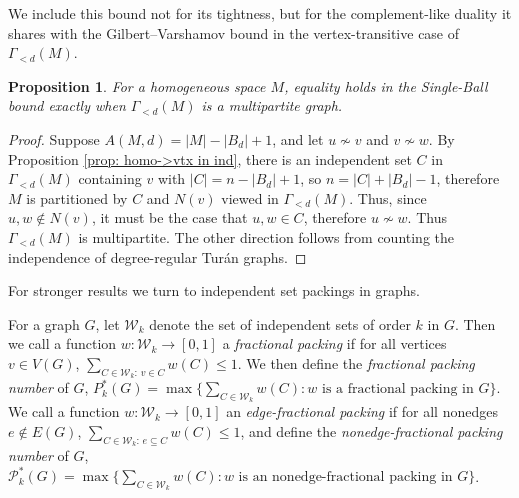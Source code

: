 \documentclass[12pt]{article}
\newtheorem{proposition}[theorem]{Proposition}
\begin{document}
We include this bound not for its tightness, but for the complement-like duality it shares with the Gilbert–Varshamov bound in the vertex-transitive  case of $\Gamma_{<d}(M)$.


\begin{proposition}
\label{prop: SB char}
For a homogeneous space $M$, equality holds in the Single-Ball bound exactly when $\Gamma_{<d}(M)$ is a multipartite graph.
\end{proposition}
\begin{proof}
Suppose $A(M,d)=|M|-|B_d|+1$, and let $u\not\sim v$ and $v\not\sim w$. By Proposition \ref{prop: homo->vtx in ind}, there is an independent set $C$ in $\Gamma_{<d}(M)$ containing $v$ with $|C|=n-|B_d|+1$, so $n=|C|+|B_d|-1$, therefore $M$ is partitioned by $C$ and $N(v)$ viewed in $\Gamma_{<d}(M)$. Thus, since $u,w\not\in N(v)$, it must be the case that $u,w\in C$, therefore $u\not\sim w$. Thus $\Gamma_{<d}(M)$ is multipartite. The other direction follows from counting the independence of degree-regular Tur\'an graphs.
\end{proof}



\noindent For stronger results we turn to independent set packings in graphs.

For a graph $G$, let $\mathcal{W}_k$ denote the set of independent sets of order $k$ in $G$. Then we  call a function $w:\mathcal{W}_k\to[0,1]$ a \textit{fractional packing} if for all vertices $v\in V(G)$, $\sum_{C\in\mathcal{W}_k:\,v\in C}w(C)\leq1$. We then define the \textit{fractional packing number} of $G$, $P_k^*(G)=\max\{\sum_{C\in\mathcal{W}_k}w(C):\text{$w$ is a fractional packing in $G$}\}$. We  call a function $w:\mathcal{W}_k\to[0,1]$ an \textit{edge-fractional packing} if for all nonedges $e\not\in E(G)$, $\sum_{C\in\mathcal{W}_k:\,e\subseteq C}w(C)\leq1$, and define the \textit{nonedge-fractional packing number} of $G$, $\mathcal{P}_k^*(G)=\max\{\sum_{C\in\mathcal{W}_k}w(C):\text{$w$ is an nonedge-fractional packing in $G$}\}$. 
\end{document}
